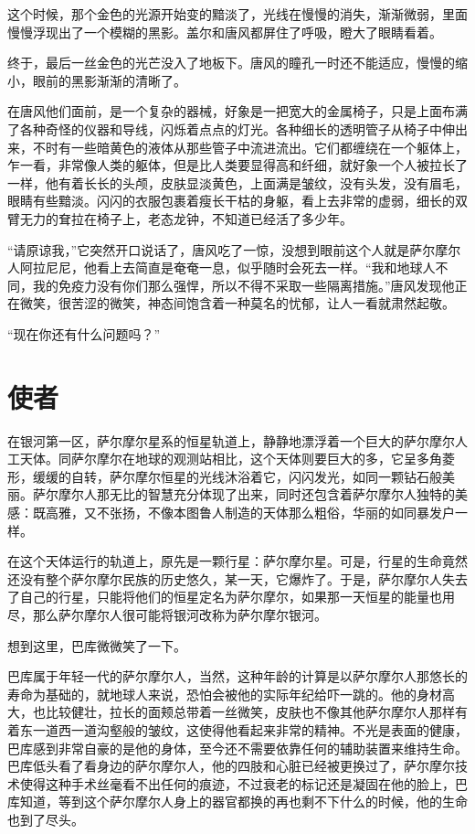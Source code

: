 这个时候，那个金色的光源开始变的黯淡了，光线在慢慢的消失，渐渐微弱，里面慢慢浮现出了一个模糊的黑影。盖尔和唐风都屏住了呼吸，瞪大了眼睛看着。

终于，最后一丝金色的光芒没入了地板下。唐风的瞳孔一时还不能适应，慢慢的缩小，眼前的黑影渐渐的清晰了。

在唐风他们面前，是一个复杂的器械，好象是一把宽大的金属椅子，只是上面布满了各种奇怪的仪器和导线，闪烁着点点的灯光。各种细长的透明管子从椅子中伸出来，不时有一些暗黄色的液体从那些管子中流进流出。它们都缠绕在一个躯体上，乍一看，非常像人类的躯体，但是比人类要显得高和纤细，就好象一个人被拉长了一样，他有着长长的头颅，皮肤显淡黄色，上面满是皱纹，没有头发，没有眉毛，眼睛有些黯淡。闪闪的衣服包裹着瘦长干枯的身躯，看上去非常的虚弱，细长的双臂无力的耷拉在椅子上，老态龙钟，不知道已经活了多少年。

“请原谅我，”它突然开口说话了，唐风吃了一惊，没想到眼前这个人就是萨尔摩尔人阿拉尼尼，他看上去简直是奄奄一息，似乎随时会死去一样。“我和地球人不同，我的免疫力没有你们那么强悍，所以不得不采取一些隔离措施。”唐风发现他正在微笑，很苦涩的微笑，神态间饱含着一种莫名的忧郁，让人一看就肃然起敬。

“现在你还有什么问题吗？”

\chapter{使者}

在银河第一区，萨尔摩尔星系的恒星轨道上，静静地漂浮着一个巨大的萨尔摩尔人工天体。同萨尔摩尔在地球的观测站相比，这个天体则要巨大的多，它呈多角菱形，缓缓的自转，萨尔摩尔恒星的光线沐浴着它，闪闪发光，如同一颗钻石般美丽。萨尔摩尔人那无比的智慧充分体现了出来，同时还包含着萨尔摩尔人独特的美感：既高雅，又不张扬，不像本图鲁人制造的天体那么粗俗，华丽的如同暴发户一样。

在这个天体运行的轨道上，原先是一颗行星：萨尔摩尔星。可是，行星的生命竟然还没有整个萨尔摩尔民族的历史悠久，某一天，它爆炸了。于是，萨尔摩尔人失去了自己的行星，只能将他们的恒星定名为萨尔摩尔，如果那一天恒星的能量也用尽，那么萨尔摩尔人很可能将银河改称为萨尔摩尔银河。

想到这里，巴库微微笑了一下。

巴库属于年轻一代的萨尔摩尔人，当然，这种年龄的计算是以萨尔摩尔人那悠长的寿命为基础的，就地球人来说，恐怕会被他的实际年纪给吓一跳的。他的身材高大，也比较健壮，拉长的面颊总带着一丝微笑，皮肤也不像其他萨尔摩尔人那样有着东一道西一道沟壑般的皱纹，这使得他看起来非常的精神。不光是表面的健康，巴库感到非常自豪的是他的身体，至今还不需要依靠任何的辅助装置来维持生命。巴库低头看了看身边的萨尔摩尔人，他的四肢和心脏已经被更换过了，萨尔摩尔技术使得这种手术丝毫看不出任何的痕迹，不过衰老的标记还是凝固在他的脸上，巴库知道，等到这个萨尔摩尔人身上的器官都换的再也剩不下什么的时候，他的生命也到了尽头。

